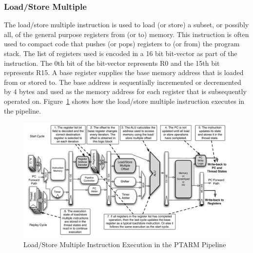 \subsubsection{Load/Store Multiple}
The load/store multiple instruction is used to load (or store) a subset, or possibly all, of the general purpose registers from (or to) memory.
This instruction is often used to compact code that pushes (or pops) registers to (or from) the program stack.
The list of registers used is encoded in a 16 bit bit-vector as part of the instruction.
The 0th bit of the bit-vector represents R0 and the 15th bit represents R15.
A base register supplies the base memory address that is loaded from or stored to.
The base address is sequentially incremented or decremented by 4 bytes and used as the memory address for each register that is subsequently operated on. 
Figure~\ref{fig:ldstrm_pipeline_implementation} shows how the load/store multiple instruction executes in the pipeline. 

\begin{figure}[h]
  \vspace{-15pt}
  \begin{center}
    \includegraphics[scale=.54]{figs/ldstrm_pipeline_implementation}
  \end{center}
  \vspace{-3mm}
  \caption{Load/Store Multiple Instruction Execution in the PTARM Pipeline}
  \label{fig:ldstrm_pipeline_implementation}
\end{figure}

